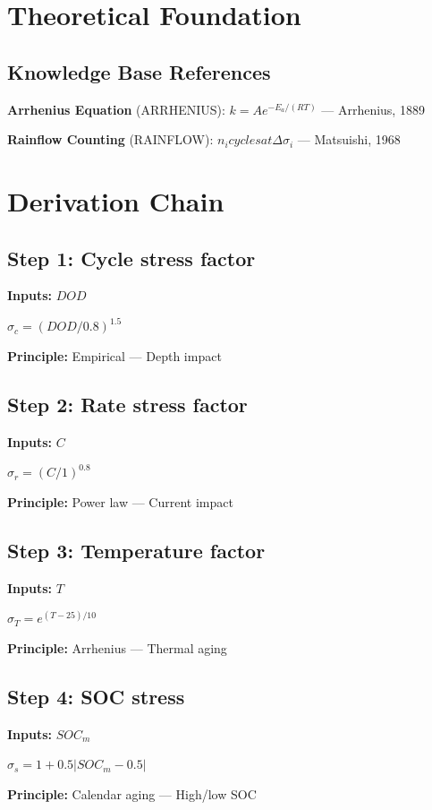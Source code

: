 \documentclass[11pt,twocolumn]{article}
\begin{document}
\section{Theoretical Foundation}

\subsection{Knowledge Base References}
\textbf{Arrhenius Equation} (ARRHENIUS): $k = A e^{-E_a/(RT)}$ --- Arrhenius, 1889

\textbf{Rainflow Counting} (RAINFLOW): $n_i cycles at \Delta\sigma_i$ --- Matsuishi, 1968


\section{Derivation Chain}

\subsection*{Step 1: Cycle stress factor}
\textbf{Inputs:} $DOD$

$\sigma_c = (DOD/0.8)^{1.5}$

\textbf{Principle:} Empirical --- Depth impact

\subsection*{Step 2: Rate stress factor}
\textbf{Inputs:} $C$

$\sigma_r = (C/1)^{0.8}$

\textbf{Principle:} Power law --- Current impact

\subsection*{Step 3: Temperature factor}
\textbf{Inputs:} $T$

$\sigma_T = e^{(T-25)/10}$

\textbf{Principle:} Arrhenius --- Thermal aging

\subsection*{Step 4: SOC stress}
\textbf{Inputs:} $SOC_m$

$\sigma_s = 1 + 0.5|SOC_m - 0.5|$

\textbf{Principle:} Calendar aging --- High/low SOC
\end{document}
